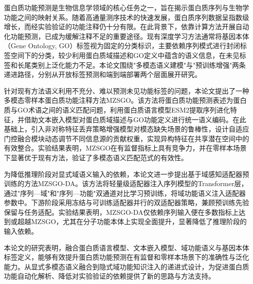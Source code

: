 \begin{cabstract}

蛋白质功能预测是生物信息学领域的核心任务之一，旨在揭示蛋白质序列与生物学功能之间的映射关系。随着高通量测序技术的快速发展，蛋白质序列数据呈指数级增长，而经实验验证的功能注释仍十分有限。在此背景下，依靠计算方法开展自动化功能预测，已成为缓解注释不足的重要途径。现有深度学习方法通常将基因本体（Gene Ontology, GO）标签视为固定的分类标识，主要依赖序列模式进行封闭标签空间下的分类，较少利用蛋白质域描述和GO定义中蕴含的语义信息，在未见标签和长尾类别上泛化能力不足。本论文围绕"多模态语义建模"与"预训练增强"两条递进路径，分别从开放标签预测和端到端部署两个层面展开研究。

针对现有方法语义利用不充分、难以预测未见功能标签的问题，本论文提出了一种多模态零样本蛋白质功能注释方法MZSGO。该方法将蛋白质功能预测表述为蛋白质与GO术语之间的语义匹配问题，利用蛋白质语言模型ESM2提取序列进化特征，并借助文本嵌入模型对蛋白质域描述与GO功能定义进行统一语义编码。在此基础上，引入非对称特征丢弃策略增强模型对模态缺失场景的鲁棒性，设计自适应门控融合模块动态调节不同信息源的贡献权重，实现异构特征在共享潜在空间中的有效整合。实验结果表明，MZSGO在有监督指标上具有竞争力，并在零样本场景下显著优于现有方法，验证了多模态语义匹配范式的有效性。

为降低推理阶段对显式域语义输入的依赖，本论文进一步提出基于域感知适配器预训练的方法MZSGO-DA。该方法将轻量级适配器注入序列模型的Transformer层，通过"序列—域"和"序列—功能"双通道对比学习预训练，将域功能语义注入适配器参数中。下游阶段采用冻结与可训练适配器并行的双适配器策略，兼顾预训练先验保留与任务适配。实验结果表明，MZSGO-DA仅依赖序列输入便在多数指标上达到或超越MZSGO，尤其在分子功能本体上实现全面提升，显著降低了推理阶段的输入依赖。

本论文的研究表明，融合蛋白质语言模型、文本嵌入模型、域功能语义与基因本体标签定义，能够有效提升蛋白质功能预测在有监督和零样本场景下的准确性与泛化能力。从显式多模态语义融合到隐式域功能知识注入的递进式设计，为促进蛋白质功能自动化解析、降低对实验验证的依赖提供了新的思路与方法支持。

\end{cabstract}

